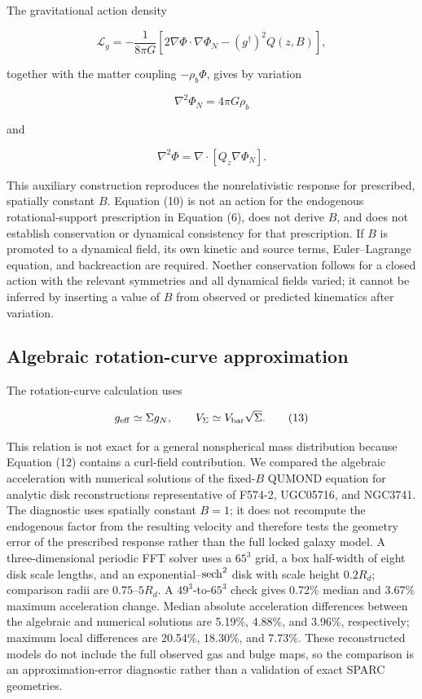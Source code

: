 \documentclass[utf8]{FrontiersinHarvard}
\begin{document}
The gravitational action density

\[
\mathcal L_g=-\frac{1}{8\pi G}
\left[2\nabla\Phi\cdot\nabla\Phi_N-(g^\dagger)^2Q(z,B)\right],
\tag{10}
\]

together with the matter coupling \(-\rho_b\Phi\), gives by variation

\[
\nabla^2\Phi_N=4\pi G\rho_b
\tag{11}
\]

and

\[
\nabla^2\Phi=\nabla\cdot\left[Q_z\nabla\Phi_N\right].
\tag{12}
\]

This auxiliary construction reproduces the nonrelativistic response for prescribed, spatially constant \(B\). Equation (10) is not an action for the endogenous rotational-support prescription in Equation (6), does not derive \(B\), and does not establish conservation or dynamical consistency for that prescription. If \(B\) is promoted to a dynamical field, its own kinetic and source terms, Euler--Lagrange equation, and backreaction are required. Noether conservation follows for a closed action with the relevant symmetries and all dynamical fields varied; it cannot be inferred by inserting a value of \(B\) from observed or predicted kinematics after variation.

\subsection{Algebraic rotation-curve approximation}\label{algebraic-rotation-curve-approximation}

The rotation-curve calculation uses

\[
g_{\rm eff}\simeq\Sigma g_N,\qquad
V_\Sigma\simeq V_{\rm bar}\sqrt{\Sigma}.
\tag{13}
\]

This relation is not exact for a general nonspherical mass distribution because Equation (12) contains a curl-field contribution. We compared the algebraic acceleration with numerical solutions of the fixed-\(B\) QUMOND equation for analytic disk reconstructions representative of F574-2, UGC05716, and NGC3741. The diagnostic uses spatially constant \(B=1\); it does not recompute the endogenous factor from the resulting velocity and therefore tests the geometry error of the prescribed response rather than the full locked galaxy model. A three-dimensional periodic FFT solver uses a \(65^3\) grid, a box half-width of eight disk scale lengths, and an exponential--\({\rm sech}^2\) disk with scale height \(0.2R_d\); comparison radii are \(0.75\)--\(5R_d\). A \(49^3\)-to-\(65^3\) check gives 0.72\% median and 3.67\% maximum acceleration change. Median absolute acceleration differences between the algebraic and numerical solutions are 5.19\%, 4.88\%, and 3.96\%, respectively; maximum local differences are 20.54\%, 18.30\%, and 7.73\%. These reconstructed models do not include the full observed gas and bulge maps, so the comparison is an approximation-error diagnostic rather than a validation of exact SPARC geometries.
\end{document}
